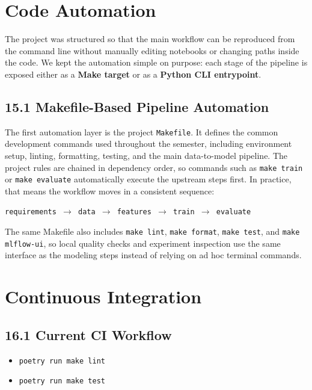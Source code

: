 \documentclass{article}
\newcommand{\code}[1]{\texttt{\small #1}}
\begin{document}
\section{\textcolor{accentblue}{Code Automation}}

The project was structured so that the main workflow can be reproduced from the command line without manually editing notebooks or changing paths inside the code. We kept the automation simple on purpose: each stage of the pipeline is exposed either as a \textbf{Make target} or as a \textbf{Python CLI entrypoint}.

\subsection*{\textcolor{accentgold}{15.1 Makefile-Based Pipeline Automation}}

The first automation layer is the project \code{Makefile}. It defines the common development commands used throughout the semester, including environment setup, linting, formatting, testing, and the main data-to-model pipeline. The project rules are chained in dependency order, so commands such as \code{make train} or \code{make evaluate} automatically execute the upstream steps first. In practice, that means the workflow moves in a consistent sequence:

\begin{center}
\code{requirements $\rightarrow$ data $\rightarrow$ features $\rightarrow$ train $\rightarrow$ evaluate}
\end{center}

The same Makefile also includes \code{make lint}, \code{make format}, \code{make test}, and \code{make mlflow-ui}, so local quality checks and experiment inspection use the same interface as the modeling steps instead of relying on ad hoc terminal commands.

\section{\textcolor{accentblue}{Continuous Integration}}


\subsection*{\textcolor{accentgold}{16.1 Current CI Workflow}}

\begin{itemize}[label=\textcolor{accentblue}{\textbullet}]
    \item \code{poetry run make lint}
    \item \code{poetry run make test}
\end{itemize}
\end{document}

